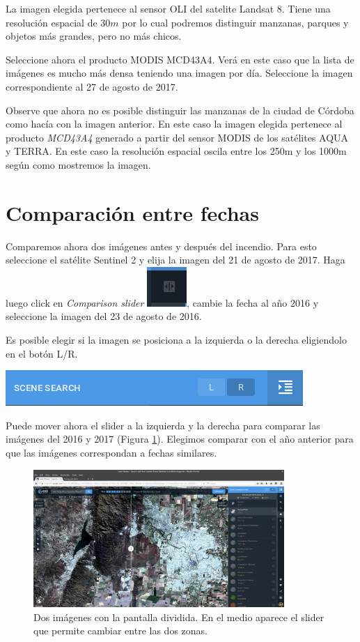\documentclass[a4paper,12pt]{book}
\begin{document}
La imagen elegida pertenece al sensor OLI del satelite Landsat 8. Tiene una resolución espacial de $30m$ por lo cual podremos distinguir manzanas, parques y objetos más grandes, pero no más chicos.

Seleccione ahora el producto MODIS MCD43A4. Verá en este caso que la lista de imágenes es mucho más densa teniendo una imagen por día. Seleccione la imagen correspondiente al 27 de agosto de 2017.

Observe que ahora no es posible distinguir las manzanas de la ciudad de Córdoba como hacía con la imagen anterior. En este caso la imagen elegida pertenece al producto \emph{MCD43A4} generado a partir del sensor MODIS de los satélites AQUA y TERRA. En este caso la resolución espacial oscila entre los 250m y los 1000m según como mostremos la imagen.

\section{Comparación entre fechas}
Comparemos ahora dos imágenes antes y después del incendio. Para esto seleccione el satélite Sentinel 2 y elija la imagen del 21 de agosto de 2017. Haga luego click en \emph{Comparison slider} \includegraphics[scale=0.2]{in:LR.png}, cambie la fecha al año 2016 y seleccione la imagen del 23 de agosto de 2016.

Es posible elegir si la imagen se posiciona a la izquierda o la derecha eligiendolo en el botón L/R.

\begin{center}\includegraphics[scale=0.4]{in:LorR.png}\end{center}

Puede mover ahora el slider a la izquierda y la derecha para comparar las imágenes del 2016 y 2017 (Figura \ref{fig:slider}). Elegimos comparar con el año anterior para que las imágenes correspondan a fechas similares.

\begin{figure}[h!]
    \centering
    \includegraphics[width=0.85\textwidth]{fig:slider.png}
    \caption{Dos imágenes con la pantalla dividida. En el medio aparece el slider que permite cambiar entre las dos zonas.}
    \label{fig:slider}
\end{figure}
\end{document}
